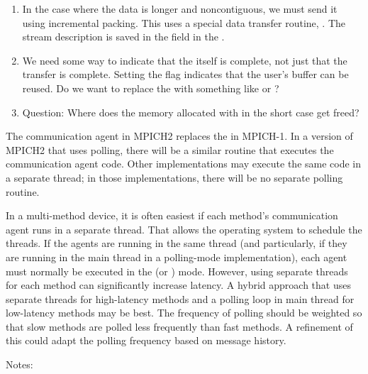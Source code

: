 \begin{enumerate}
\item In the case where the data is longer and noncontiguous, we must send it
  using incremental packing.  This uses a special data transfer routine,
  .  The stream description is saved in
  the  field in the .

\item We need some way to indicate that the  itself 
  is complete, not just that the transfer is complete.  Setting the
   flag indicates that the user's 
  buffer 
  can be reused.  Do we want to replace the  with something like
   or ?

\item Question:  Where does the memory allocated with  in
  the short case get freed?  
  
\end{enumerate}

\ifcodefirst
\else
{}
\fi

The communication agent in MPICH2 replaces the  in
MPICH-1.  In a version of MPICH2 that uses polling, there will be a similar
routine that executes the communication agent code.  Other implementations may
execute the same code in a separate thread; in those implementations, there
will be no separate polling routine.

In a multi-method device, it is often easiest if each method's communication 
agent runs in a separate thread.  That allows the operating system to  
schedule the threads.  If the agents are running in the same thread (and 
particularly, if they are running in the main thread in a polling-mode 
implementation), each agent must normally be executed in the
 (or ) mode.
However, using separate threads for each method can significantly increase
latency.  A hybrid approach that uses separate threads for high-latency
methods and a polling loop in main thread for low-latency methods may be
best.  The frequency of polling should be weighted so that slow methods are
polled less frequently than fast methods.  A refinement of this could adapt
the polling frequency based on message history.

\ifcodefirst
{}
\fi

Notes:

